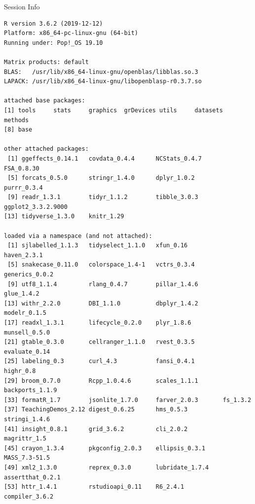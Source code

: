 \documentclass[10pt]{beamer}\usepackage[]{graphicx}\usepackage[]{color}
\makeatletter
\newenvironment{kframe}{%
 \def\at@end@of@kframe{}%
 \ifinner\ifhmode%
  \def\at@end@of@kframe{\end{minipage}}%
  \begin{minipage}{\columnwidth}%
 \fi\fi%
 \def\FrameCommand##1{\hskip\@totalleftmargin \hskip-\fboxsep
 \colorbox{shadecolor}{##1}\hskip-\fboxsep
     \hskip-\linewidth \hskip-\@totalleftmargin \hskip\columnwidth}%
 \MakeFramed {\advance\hsize-\width
   \@totalleftmargin\z@ \linewidth\hsize
   \@setminipage}}%
 {\par\unskip\endMakeFramed%
 \at@end@of@kframe}
\newenvironment{knitrout}{}{} %
\makeatother
\begin{document}


\begin{frame}[fragile]{Session Info}
	\tiny
	
\begin{knitrout}\tiny
{}\color{fgcolor}\begin{kframe}
\begin{verbatim}
R version 3.6.2 (2019-12-12)
Platform: x86_64-pc-linux-gnu (64-bit)
Running under: Pop!_OS 19.10

Matrix products: default
BLAS:   /usr/lib/x86_64-linux-gnu/openblas/libblas.so.3
LAPACK: /usr/lib/x86_64-linux-gnu/libopenblasp-r0.3.7.so

attached base packages:
[1] tools     stats     graphics  grDevices utils     datasets  methods  
[8] base     

other attached packages:
 [1] ggeffects_0.14.1   covdata_0.4.4      NCStats_0.4.7      FSA_0.8.30        
 [5] forcats_0.5.0      stringr_1.4.0      dplyr_1.0.2        purrr_0.3.4       
 [9] readr_1.3.1        tidyr_1.1.2        tibble_3.0.3       ggplot2_3.3.2.9000
[13] tidyverse_1.3.0    knitr_1.29        

loaded via a namespace (and not attached):
 [1] sjlabelled_1.1.3   tidyselect_1.1.0   xfun_0.16          haven_2.3.1       
 [5] snakecase_0.11.0   colorspace_1.4-1   vctrs_0.3.4        generics_0.0.2    
 [9] utf8_1.1.4         rlang_0.4.7        pillar_1.4.6       glue_1.4.2        
[13] withr_2.2.0        DBI_1.1.0          dbplyr_1.4.2       modelr_0.1.5      
[17] readxl_1.3.1       lifecycle_0.2.0    plyr_1.8.6         munsell_0.5.0     
[21] gtable_0.3.0       cellranger_1.1.0   rvest_0.3.5        evaluate_0.14     
[25] labeling_0.3       curl_4.3           fansi_0.4.1        highr_0.8         
[29] broom_0.7.0        Rcpp_1.0.4.6       scales_1.1.1       backports_1.1.9   
[33] formatR_1.7        jsonlite_1.7.0     farver_2.0.3       fs_1.3.2          
[37] TeachingDemos_2.12 digest_0.6.25      hms_0.5.3          stringi_1.4.6     
[41] insight_0.8.1      grid_3.6.2         cli_2.0.2          magrittr_1.5      
[45] crayon_1.3.4       pkgconfig_2.0.3    ellipsis_0.3.1     MASS_7.3-51.5     
[49] xml2_1.3.0         reprex_0.3.0       lubridate_1.7.4    assertthat_0.2.1  
[53] httr_1.4.1         rstudioapi_0.11    R6_2.4.1           compiler_3.6.2    
\end{verbatim}
\end{kframe}
\end{knitrout}
	
\end{frame}
\end{document}
